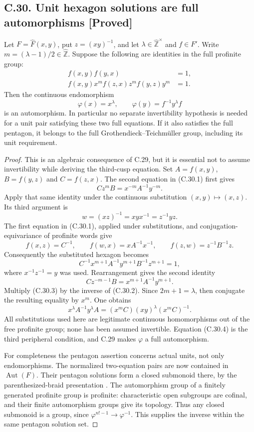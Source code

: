\documentclass[11pt]{article}
\newcommand{\statement}[3]{\subsection*{#1. #3 [#2]}}
\begin{document}
\statement{C.30}{Proved}{Unit hexagon solutions are full automorphisms}
Let $F=\widehat F(x,y)$, put $z=(xy)^{-1}$, and let
$\lambda\in\widehat{\mathbb Z}^{\times}$ and $f\in F'$.
Write $m=(\lambda-1)/2\in\widehat{\mathbb Z}$.
Suppose the following are identities in the full profinite group:
\[
 \begin{split}
 f(x,y)f(y,x)&=1,\\
 f(x,y)x^m f(z,x)z^m f(y,z)y^m&=1.
 \end{split}                                                    \tag{C.30.1}
\]
Then the continuous endomorphism
\[
             \varphi(x)=x^\lambda,\qquad
             \varphi(y)=f^{-1}y^\lambda f
\]
is an automorphism. In particular no separate invertibility hypothesis
is needed for a unit pair satisfying these two full equations. If it
also satisfies the full pentagon, it belongs to the full
Grothendieck--Teichm\"uller group, including its unit requirement.

\begin{proof}
This is an algebraic consequence of C.29, but it is essential not to
assume invertibility while deriving the third-cusp equation.
Set $A=f(x,y)$, $B=f(y,z)$ and $C=f(z,x)$. The second equation in
(C.30.1) first gives
\[
                C z^m B=x^{-m}A^{-1}y^{-m}.                      \tag{C.30.2}
\]
Apply that same identity under the continuous substitution
$(x,y)\mapsto(x,z)$. Its third argument is
\[
                w=(xz)^{-1}=xyx^{-1}=z^{-1}yz.
\]
The first equation in (C.30.1), applied under substitutions, and
conjugation-equivariance of profinite words give
\[
 f(x,z)=C^{-1},\qquad
 f(w,x)=xA^{-1}x^{-1},\qquad
 f(z,w)=z^{-1}B^{-1}z.
\]
Consequently the substituted hexagon becomes
\[
 C^{-1}x^{m+1}A^{-1}y^{m+1}B^{-1}z^{m+1}=1,
\]
where $x^{-1}z^{-1}=y$ was used. Rearrangement gives the second identity
\[
          C z^{-m-1}B=x^{m+1}A^{-1}y^{m+1}.                     \tag{C.30.3}
\]
Multiply (C.30.3) by the inverse of (C.30.2). Since $2m+1=\lambda$,
then conjugate the resulting equality by $x^m$. One obtains
\[
 x^\lambda A^{-1}y^\lambda A
       =(x^mC)(xy)^\lambda(x^mC)^{-1}.                         \tag{C.30.4}
\]
All substitutions used here are legitimate continuous homomorphisms
out of the free profinite group; none has been assumed invertible.
Equation (C.30.4) is the third peripheral condition, and C.29 makes
$\varphi$ a full automorphism.

For completeness the pentagon assertion concerns actual units, not
only endomorphisms. The normalized two-equation pairs are now
contained in $\operatorname{Aut}(F)$. Their pentagon solutions form
a closed submonoid there, by the parenthesized-braid presentation
\cite[Lemma 7.1 and Proposition 7.3]{CEBHR2019}. The automorphism group
of a finitely generated profinite group is profinite: characteristic
open subgroups are cofinal, and their finite automorphism groups
give its topology. Thus any closed submonoid is a group, since
$\varphi^{n!-1}\to\varphi^{-1}$. This supplies the inverse within
the same pentagon solution set.
\end{proof}
\end{document}

